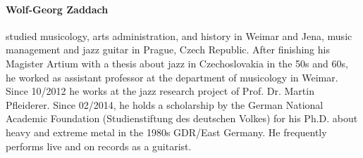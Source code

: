 {\paragraph{Wolf-Georg Zaddach} studied musicology, arts administration, and history in Weimar and Jena, music management and jazz guitar in Prague, Czech Republic. After finishing his Magister Artium with a thesis about jazz in Czechoslovakia in the 50s and 60s, he worked as assistant professor at the department of musicology in Weimar. Since 10/2012 he works at the jazz research project of Prof. Dr. Martin Pfleiderer. Since 02/2014, he holds a scholarship by the German National Academic Foundation (Studienstiftung des deutschen Volkes) for his Ph.D. about heavy and extreme metal in the 1980s GDR/East Germany. He frequently performs live and on records as a guitarist.}

